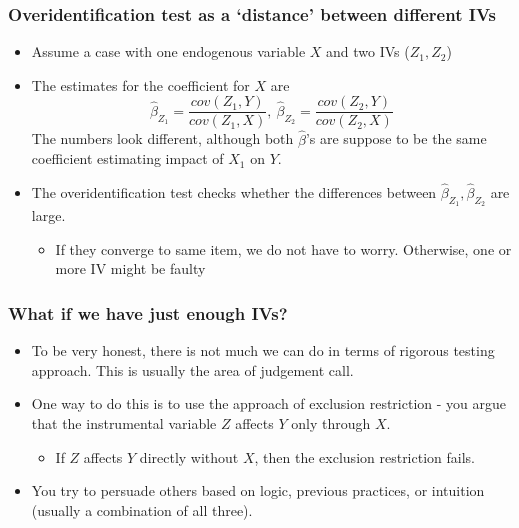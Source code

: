 \documentclass[aspectratio=169]{beamer}
\begin{document}
\begin{frame}
\frametitle{Overidentification test as a `distance' between different IVs}
\begin{itemize}
\item Assume a case with one endogenous variable $X$ and two IVs ($Z_1, Z_2$)
\item The estimates for the coefficient for $X$ are 
\[
\hat{\beta}_{Z_1}=\frac{cov(Z_1,Y)}{cov(Z_1,X)}, \ \hat{\beta}_{Z_2}=\frac{cov(Z_2,Y)}{cov(Z_2,X)}
\]
The numbers look different, although both $\hat{\beta}$'s are suppose to be the same coefficient estimating impact of $X_1$ on $Y$. 
\item The overidentification test checks whether the differences between $\hat{\beta}_{Z_1}, \hat{\beta}_{Z_2}$ are large.
\begin{itemize}
\item If they converge to same item, we do not have to worry. Otherwise, one or more IV might be faulty
\end{itemize}
\end{itemize}
\end{frame}

\begin{frame}
\frametitle{What if we have just enough IVs?}
\begin{itemize}
\item To be very honest, there is not much we can do in terms of rigorous testing approach. This is usually the area of judgement call. 
\item One way to do this is to use the approach of exclusion restriction - you argue that the instrumental variable $Z$ affects $Y$ only through $X$. 
\begin{itemize}
\item If $Z$ affects $Y$ directly without $X$, then the exclusion restriction fails. 
\end{itemize}
\item You try to persuade others based on logic, previous practices, or intuition (usually a combination of all three). 
\end{itemize}
\end{frame}


\end{document}
